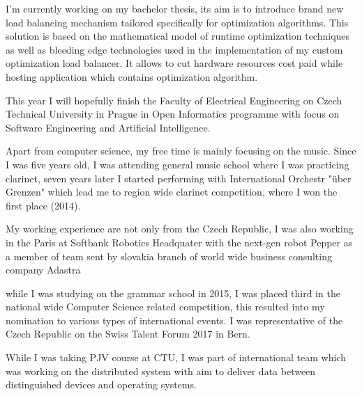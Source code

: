 \documentclass[11pt, a4paper]{awesome-cv} %
\begin{document}
\makecvheader %

\makelettertitle %


\begin{cvletter}



I'm currently working on my bachelor thesis, 
its aim is to introduce brand new load balancing mechanism tailored specifically for optimization algorithms. 
This solution is based on the mathematical model of runtime optimization techniques as well as 
bleeding edge technologies used in the implementation of my custom optimization load balancer.
It allows to cut hardware resources cost paid while hosting application which contains optimization algorithm.

This year I will hopefully finish the Faculty of Electrical Engineering on Czech Technical University in Prague in Open Informatics programme 
with focus on Software Engineering and Artificial Intelligence.

Apart from computer science, my free time is mainly focusing on the music. 
Since I was five years old, I was attending general music school where I was practicing clarinet, 
seven years later I started performing with International Orchestr "über Grenzen" which lead me to region wide clarinet competition,
where I won the first place (2014).

My working experience are not only from the Czech Republic, I was also working in the Paris at Softbank Robotics Headquater with the next-gen robot Pepper as a member of team sent by slovakia branch of world wide business consulting company Adastra

while I was studying on the grammar school in 2015, I was placed third in the national wide Computer Science related competition, this resulted into my nomination to various types of international events. I was representative of the Czech Republic on the Swiss Talent Forum 2017 in Bern.

While I was taking PJV course at CTU, I was part of international team which was working on the distributed system with aim to deliver data between distinguished devices and operating systems.


\end{cvletter}
\end{document}
